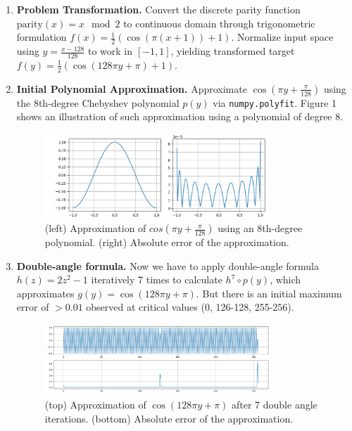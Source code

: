 \documentclass[article]{iacrtrans}
\begin{document}
\begin{enumerate}
    \item \textbf{Problem Transformation.} Convert the discrete parity function $\text{parity}(x) = x \mod 2$ to continuous domain through trigonometric formulation $f(x) = \frac{1}{2}(\cos(\pi(x+1)) + 1)$. Normalize input space using $y = \frac{x-128}{128}$ to work in $[-1,1]$, yielding transformed target $f(y) = \frac{1}{2}(\cos(128\pi y + \pi) + 1)$.
    \item \textbf{Initial Polynomial Approximation.} Approximate $\cos(\pi y + \frac{\pi}{128})$ using the 8th-degree Chebyshev polynomial $p(y)$ via \texttt{numpy.polyfit}.  Figure 1 shows an illustration of such approximation using a polynomial of degree 8.
        \begin{figure}[H]
            \centering
            \includegraphics[width=0.8\textwidth]{parity_figures/parity_Figure_1.png}
            \caption{(left) Approximation of $cos(\pi y+ \frac{\pi}{128})$ using an 8th-degree polynomial. (right) Absolute error of the approximation.}
            \label{fig:parity-1}
        \end{figure}
    \FloatBarrier
    \item \textbf{Double-angle formula.} Now we have to apply double-angle formula $h(z) = 2z^2 - 1$ iteratively 7 times  to calculate $h^7 \circ p(y)$, which approximates $g(y) = \cos(128\pi y + \pi)$. But there is an initial maximum error of $>0.01$ observed at critical values (0, 126-128, 255-256).
       \begin{figure}[H]
            \centering
            \includegraphics[width=0.8\textwidth]{parity_figures/parity_Figure_2.png}
            \caption{(top) Approximation of $\cos(128\pi y + \pi)$ after 7 double angle iterations. (bottom) Absolute error of the approximation.}

\end{figure}
\end{enumerate}
\end{document}
